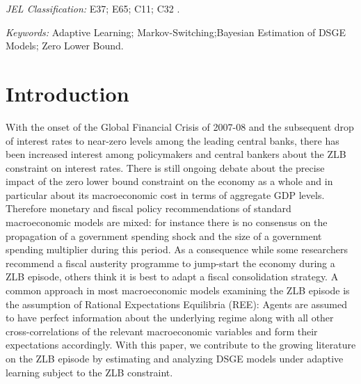\documentclass[12pt,reqno]{article}
\numberwithin{equation}{section}
\begin{document}
\vspace{3 mm}

\noindent
\textit{JEL Classification:} E37; E65; C11; C32 . \\


\vspace{3 mm}

\noindent
\textit{Keywords:} Adaptive Learning; Markov-Switching;Bayesian Estimation of DSGE Models; Zero Lower Bound. 


\section{Introduction}

With the onset of the Global Financial Crisis of 2007-08 and the subsequent drop of interest rates to near-zero levels among the leading central banks, there has been increased interest among policymakers and central bankers about the ZLB constraint on interest rates. There is still ongoing debate about the precise impact of the zero lower bound constraint on the economy as a whole and in particular about its macroeconomic cost in terms of aggregate GDP levels. Therefore monetary and fiscal policy recommendations of standard macroeconomic models are mixed: for instance there is no consensus on the propagation of a government spending shock and the size of a government spending multiplier during this period. As a consequence while some researchers recommend a fiscal austerity programme to jump-start the economy during a ZLB episode, others think it is best to adapt a fiscal consolidation strategy. A common approach in most macroeconomic models examining the ZLB episode is the assumption of Rational Expectations Equilibria (REE): Agents are assumed to have perfect information about the underlying regime along with all other cross-correlations of the relevant macroeconomic variables and form their expectations accordingly. With this paper, we contribute to the growing literature on the ZLB episode by estimating and analyzing DSGE models under adaptive learning subject to the ZLB constraint. \\
\end{document}
